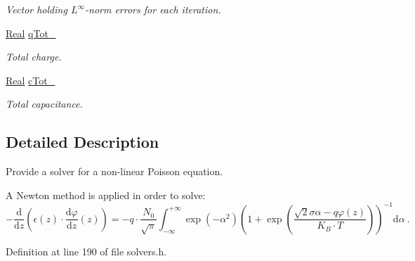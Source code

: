 \begin{DoxyCompactItemize}
\begin{DoxyCompactList}\small\item\em Vector holding $ L^\infty $-\/norm errors for each iteration. \end{DoxyCompactList}\item 
\hypertarget{classNonLinearPoisson1D_a5fa713b8efdf7b2651478e560ae70074}{\hyperlink{typedefs_8h_a060b837c3b4486ee35317744156f3da2}{Real} \hyperlink{classNonLinearPoisson1D_a5fa713b8efdf7b2651478e560ae70074}{q\-Tot\-\_\-}}\label{classNonLinearPoisson1D_a5fa713b8efdf7b2651478e560ae70074}

\begin{DoxyCompactList}\small\item\em Total charge. \end{DoxyCompactList}\item 
\hypertarget{classNonLinearPoisson1D_a4edec5e6395e5a862df829a223323533}{\hyperlink{typedefs_8h_a060b837c3b4486ee35317744156f3da2}{Real} \hyperlink{classNonLinearPoisson1D_a4edec5e6395e5a862df829a223323533}{c\-Tot\-\_\-}}\label{classNonLinearPoisson1D_a4edec5e6395e5a862df829a223323533}

\begin{DoxyCompactList}\small\item\em Total capacitance. \end{DoxyCompactList}\end{DoxyCompactItemize}


\subsection{Detailed Description}
Provide a solver for a non-\/linear Poisson equation. 

A Newton method is applied in order to solve\-: \[ -\frac{\mathrm{d}}{\mathrm{d}z} \left(\epsilon(z) \cdot \frac{\mathrm{d}\varphi}{\mathrm{d}z}(z) \right) = - q \cdot \frac{N_0}{\sqrt{\pi}} \int_{-\infty}^{+\infty} \exp\left(-\alpha^2\right) \left( 1 + \exp\left( \frac{\sqrt{2}\sigma\alpha - q\varphi(z)}{K_B \cdot T} \right) \right)^{-1} \mathrm{d}\alpha ~ . \] 

Definition at line 190 of file solvers.\-h.




